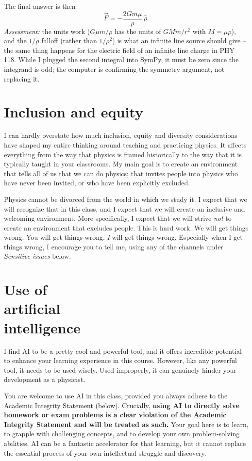 The final answer is then
\[
  \vec F = -\frac{2 G m \mu}{\rho}\,\hat{\rho} .
\]
\emph{Assessment:} the units work ($G\mu m/\rho$ has the units of
$G M m / r^2$ with $M = \mu \rho$), and the $1/\rho$ falloff (rather
than $1/\rho^2$) is what an infinite line source should give -- the same
thing happens for the electric field of an infinite line charge in PHY
118. While I plugged the second integral into SymPy, it must be zero
since the integrand is odd; the computer is confirming the symmetry
argument, not replacing it.

\bigskip

\section{Inclusion and equity}
%
I can hardly overstate how much inclusion, equity and diversity
considerations have shaped my entire thinking around teaching and
practicing physics. It affects everything from the way that physics is
framed historically to the way that it is typically taught in your
classrooms. My main goal is to create an environment that tells all of us
that we can do physics; that invites people into physics who have never
been invited, or who have been explicitly excluded.

\medskip
Physics cannot be divorced from the world in which we study it. I expect
that we will recognize that in this class, and I expect that we will
create an inclusive and welcoming environment. More specifically, I
expect that we will strive \emph{not} to create an environment that
excludes people. This is hard work. We will get things wrong. You will
get things wrong. \emph{I} will get things wrong. Especially when I get
things wrong, I encourage you to tell me, using any of the channels under
\emph{Sensitive issues} below.

\bigskip

\section{Use of \\ artificial \\ intelligence}
%
I find AI to be a pretty cool and powerful tool, and it offers incredible
potential to enhance your learning experience in this course. However,
like any powerful tool, it needs to be used wisely. Used improperly, it
can genuinely hinder your development as a physicist.

\medskip
You are welcome to use AI in this class, provided you always adhere to
the Academic Integrity Statement (below). Crucially, \textbf{using AI to
directly solve homework or exam problems is a clear violation of the
Academic Integrity Statement and will be treated as such.} Your goal
here is to learn, to grapple with challenging concepts, and to develop
your own problem-solving abilities. AI can be a fantastic accelerator for
that learning, but it cannot replace the essential process of your own
intellectual struggle and discovery.

